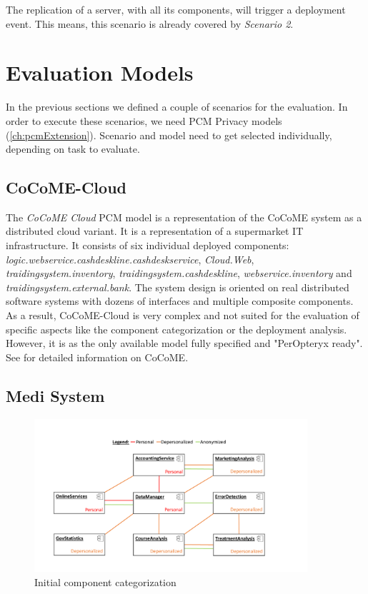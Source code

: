 The replication of a server, with all its components, will trigger a deployment event. This means, this scenario is already covered by \textit{Scenario 2}.


\section{Evaluation Models}
\label{sec:Evaluation:models}

In the previous sections we defined a couple of scenarios for the evaluation. In order to execute these scenarios, we need PCM Privacy models (\autoref{ch:pcmExtension}). Scenario and model need to get selected individually, depending on task to evaluate.

\subsection{CoCoME-Cloud}
\label{sec:eval:models:cocome}

The \textit{CoCoME Cloud} PCM model is a representation of the CoCoME system as a distributed cloud variant. It is a representation of a supermarket IT infrastructure. It consists of six individual deployed components:  \textit{logic.webservice.cashdeskline.cashdeskservice}, \textit{Cloud.Web}, \textit{traidingsystem.inventory}, \textit{traidingsystem.cashdeskline}, \textit{webservice.inventory} and \textit{traidingsystem.external.bank}. The system design is oriented on real distributed software systems with dozens of interfaces and multiple composite components. As a result, CoCoME-Cloud is very complex and not suited for the evaluation of specific aspects like the component categorization or the deployment analysis. However, it is as the only available model fully specified and "PerOpteryx ready". See \cite{Heinrich.2015} for detailed information on CoCoME.


\subsection{Medi System}
\label{sec:eval:models:medSys}

\begin{figure}[h]
	\centering
	\includegraphics[trim = 0mm 10mm 0mm 20mm, clip, width=0.90\textwidth]{graphs/medSystem_noserver}
	\caption{Initial component categorization}
	\label{fig:model:medi}
\end{figure}

